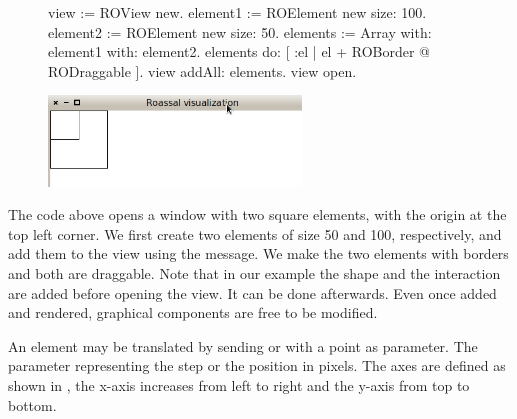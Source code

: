 \documentclass[a4paper,10pt,twoside]{book}
\begin{document}
\begin{figure}[H]
      \begin{minipage}[t]{0.6\textwidth}
      \vspace{0pt}
\begin{code}{}
view := ROView new.
element1 := ROElement new size: 100.
element2 := ROElement new size: 50.
elements := Array with: element1 with: element2.
elements do: [ :el | el + ROBorder @ RODraggable ].
view addAll: elements.
view open.
\end{code}
   \end{minipage}
   \hfill
   \begin{minipage}[t]{0.5\textwidth}
      \vspace{0pt} \raggedright
       \centering
		\includegraphics[width=0.6\textwidth]{ex3}
   \end{minipage}
\label{fig:ex3}
\end{figure}

The code above opens a window with two square elements, with the origin at the top left corner. We first create two elements of size 50 and 100, respectively, and add them to the view using the  message. We make the two elements with borders and both are draggable. Note that in our example the shape and the interaction are added before opening the view. It can be done afterwards. Even once added and rendered, graphical components are free to be modified.

An element may be translated by sending  or  with a point as parameter. The parameter representing the step or the position in pixels. The axes are defined as shown in , the x-axis increases from left to right and the y-axis from top to bottom.
\end{document}
